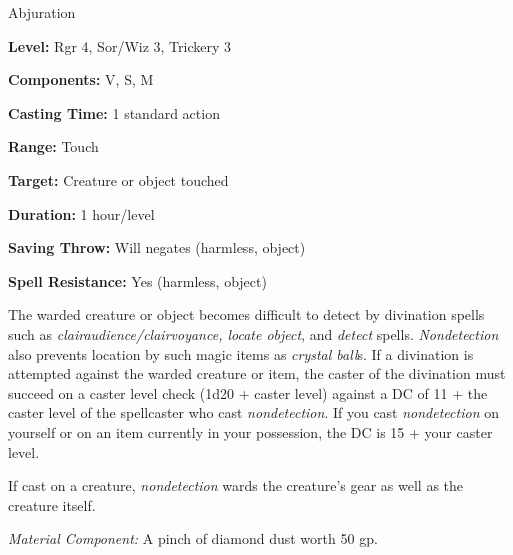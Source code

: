 
Abjuration

\textbf{Level:} Rgr 4, Sor/Wiz 3, Trickery 3

\textbf{Components:} V, S, M

\textbf{Casting Time:} 1 standard action

\textbf{Range:} Touch

\textbf{Target:} Creature or object touched

\textbf{Duration:} 1 hour/level

\textbf{Saving Throw:} Will negates (harmless, object)

\textbf{Spell Resistance:} Yes (harmless, object)

The warded creature or object becomes difficult to detect by divination spells 
such as \textit{clairaudience/clairvoyance, locate object}, and \textit{detect 
}spells. \textit{Nondetection} also prevents location by such magic items as \textit{crystal 
ball}s. If a divination is attempted against the warded creature or item, the caster 
of the divination must succeed on a caster level check (1d20 + caster level) against 
a DC of 11 + the caster level of the spellcaster who cast \textit{nondetection}. 
If you cast \textit{nondetection} on yourself or on an item currently in your possession, 
the DC is 15 + your caster level.

If cast on a creature, \textit{nondetection} wards the creature's gear as well 
as the creature itself.

\textit{Material Component:} A pinch of diamond dust worth 50 gp.

